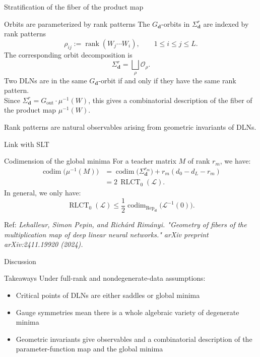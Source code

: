 \documentclass[aspectratio=169,11pt]{beamer}
\begin{document}
\begin{frame}{Stratification of the fiber of the product map}
\begin{block}{Orbits are parameterized by rank patterns}
The $G_{\mathbf{d}}$-orbits in $\Sigma_{\mathbf{d}}^r$ are indexed by rank patterns
\[
\rho_{ij}:=\operatorname{rank}(W_j\cdots W_i),
\qquad
1\leq i\leq j\leq L.
\]
The corresponding orbit decomposition is
\[
\Sigma_{\mathbf{d}}^r = \bigsqcup_{\rho} \mathcal{O}_{\rho}.
\]
Two DLNs are in the same $G_{\mathbf{d}}$-orbit if and only if they have the same rank pattern.
\\
Since $\Sigma_{\mathbf{d}}^{r} = G_{\mathrm{out}}\cdot\mu^{-1}(W)$, this gives a combinatorial description of the fiber of the product map $\mu^{-1}(W)$.
\end{block}
Rank patterns are natural observables arising from geometric invariants of DLNs.
\end{frame}
\begin{frame}{Link with SLT}
\begin{block}{Codimension of the global minima}
For a teacher matrix $M$ of rank $r_m$, we have:
    \[
    \begin{aligned}
    \operatorname{codim}\bigl(\mu^{-1}(M)\bigr)
    &=
    \operatorname{codim}\bigl(\Sigma_{\mathbf{d}}^{r_m}\bigr)
    + r_m(d_0 - d_L - r_m) \\
    &= 2\,\operatorname{RLCT}_{0}(\mathcal{L}).
    \end{aligned}
    \]
In general, we only have:
\[
\operatorname{RLCT}_{0}(\mathcal{L})
\leq
\frac{1}{2}\operatorname{codim}_{\operatorname{Rep}_{\mathbf{d}}}\bigl(\mathcal{L}^{-1}(0)\bigr).
\]
\end{block}
Ref: \textit{Lehalleur, Simon Pepin, and Richárd Rimányi. "Geometry of fibers of the multiplication map of deep linear neural networks." arXiv preprint arXiv:2411.19920 (2024).}
\end{frame}
\begin{frame}{Discussion}
\begin{block}{Takeaways}
Under full-rank and nondegenerate-data assumptions:
    \begin{itemize}
        \item Critical points of DLNs are either saddles or global minima
        \item Gauge symmetries mean there is a whole algebraic variety of degenerate minima
        \item Geometric invariants give observables and a combinatorial description of the parameter-function map and the global minima
    \end{itemize}
\end{block}
\end{frame}
\end{document}

